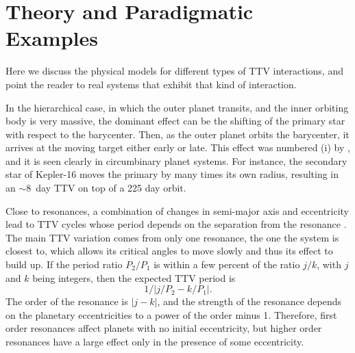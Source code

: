 \documentclass[graybox,natbib,nosecnum]{svmult}
\begin{document}

\section{Theory and Paradigmatic Examples} 

Here we discuss the physical models for different types of TTV interactions, and point the reader to real systems that exhibit that kind of interaction. 

In the hierarchical case, in which the outer planet transits, and the inner orbiting body is very massive, the dominant effect can be the shifting of the primary star with respect to the barycenter.   Then, as the outer planet orbits the barycenter, it arrives at the moving target either early or late.  This effect was numbered (i) by \cite{2005MNRAS.359..567A}, and it is seen clearly in circumbinary planet systems.  For instance, the secondary star of Kepler-16 \citep{2011Sci...333.1602D} moves the primary by many times its own radius, resulting in an $\sim 8$~day TTV on top of a 225 day orbit. 

Close to resonances, a combination of changes in semi-major axis and eccentricity lead to TTV cycles whose period depends on the separation from the resonance \citep{2012ApJ...761..122L}.  The main TTV variation comes from only one resonance, the one the system is closest to, which allows its critical angles to move slowly and thus its effect to build up.  If the period ratio $P_2/P_1$ is within a few percent of the ratio $j/k$, with $j$ and $k$ being integers, then the expected TTV period is 
\begin{equation}
1/|j/P_2-k/P_1|. \label{eqn:pttv}
\end{equation}
The order of the resonance is $|j-k|$, and the strength of the resonance depends on the planetary eccentricities to a power of the order minus 1.  Therefore, first order resonances affect planets with no initial eccentricity, but higher order resonances have a large effect only in the presence of some eccentricity. 
\end{document}
